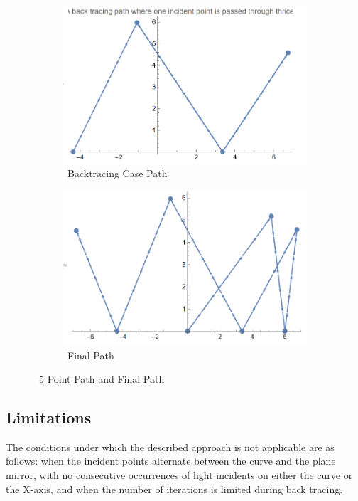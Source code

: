 \documentclass[12pt,a4paper,twoside]{report}
\begin{document}
\begin{figure}[h]
	\begin{subfigure}[h]{0.5\textwidth}
		\centering
		\includegraphics[width=\textwidth]{5pointpath.png}
		\caption{~Backtracing Case Path}
	\end{subfigure}
	\begin{subfigure}[h]{0.5\textwidth}
		\centering
		\includegraphics[width=1\textwidth]{finalpath.png}
		\caption{~Final Path}
	\end{subfigure}
	\caption{~5 Point Path and Final Path}
	
\end{figure}

\subsection{Limitations}
The conditions under which the described approach is not applicable are as follows: when the incident points alternate between the curve and the plane mirror, with no consecutive occurrences of light incidents on either the curve or the X-axis, and when the number of iterations is limited during back tracing.
\end{document}
